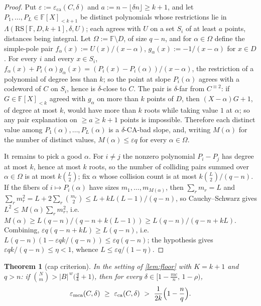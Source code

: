 \documentclass[11pt]{amsart}
\newtheorem{theorem}{Theorem}[section]
\theoremstyle{definition}
\theoremstyle{remark}
\newcommand{\F}{\mathbb{F}}
\newcommand{\RS}{\mathrm{RS}}
\newcommand{\eca}{\varepsilon_{\mathrm{ca}}}
\newcommand{\emca}{\varepsilon_{\mathrm{mca}}}
\newcommand{\Lst}{\Lambda}
\begin{document}
\begin{proof}
Put $\varepsilon:=\eca(C,\delta)$ and $a:=n-\lfloor\delta n\rfloor\ge k+1$, and let $P_1,\dots,P_L\in\F[X]_{<k+1}$ be distinct polynomials whose restrictions lie in $\Lst(\RS[\F,D,k+1],\delta,U)$; each agrees with $U$ on a set $S_i$ of at least $a$ points, distances being integral. Let $\Omega:=\F\setminus D$, of size $q-n$, and for $\alpha\in\Omega$ define the simple-pole pair $f_\alpha(x):=U(x)/(x-\alpha)$, $g_\alpha(x):=-1/(x-\alpha)$ for $x\in D$. For every $i$ and every $x\in S_i$, $f_\alpha(x)+P_i(\alpha)g_\alpha(x)=(P_i(x)-P_i(\alpha))/(x-\alpha)$, the restriction of a polynomial of degree less than $k$; so the point at slope $P_i(\alpha)$ agrees with a codeword of $C$ on $S_i$, hence is $\delta$-close to $C$. The pair is $\delta$-far from $C^{\equiv2}$: if $G\in\F[X]_{<k}$ agreed with $g_\alpha$ on more than $k$ points of $D$, then $(X-\alpha)G+1$, of degree at most $k$, would have more than $k$ roots while taking value $1$ at $\alpha$; so any pair explanation on $\ge a\ge k+1$ points is impossible. Therefore each distinct value among $P_1(\alpha),\dots,P_L(\alpha)$ is a $\delta$-CA-bad slope, and, writing $M(\alpha)$ for the number of distinct values, $M(\alpha)\le\varepsilon q$ for every $\alpha\in\Omega$.

It remains to pick a good $\alpha$. For $i\ne j$ the nonzero polynomial $P_i-P_j$ has degree at most $k$, hence at most $k$ roots, so the number of colliding pairs summed over $\alpha\in\Omega$ is at most $k\binom L2$; fix $\alpha$ whose collision count is at most $k\binom L2/(q-n)$. If the fibers of $i\mapsto P_i(\alpha)$ have sizes $m_1,\dots,m_{M(\alpha)}$, then $\sum_rm_r=L$ and $\sum_rm_r^2=L+2\sum_r\binom{m_r}2\le L+kL(L-1)/(q-n)$, so Cauchy--Schwarz gives $L^2\le M(\alpha)\sum_rm_r^2$, i.e.\ $M(\alpha)\ge L(q-n)/(q-n+k(L-1))\ge L(q-n)/(q-n+kL)$. Combining, $\varepsilon q(q-n+kL)\ge L(q-n)$, i.e.\ $L(q-n)(1-\varepsilon qk/(q-n))\le\varepsilon q(q-n)$; the hypothesis gives $\varepsilon qk/(q-n)\le\eta<1$, whence $L\le\varepsilon q/(1-\eta)$.
\end{proof}

\begin{theorem}[cap criterion]\label{thm:cap}
In the setting of \cref{lem:floor} with $K=k+1$ and $q>n$: if
$\binom Nm>|B|^{\,w}\bigl(\frac qk+1\bigr)$,
then for every $\delta\in[1-\frac{mc}n,\,1-\rho)$,
\[
\emca(C,\delta)\ \ge\ \eca(C,\delta)\ >\ \frac1{2k}\Bigl(1-\frac nq\Bigr).
\]
\end{theorem}
\end{document}
